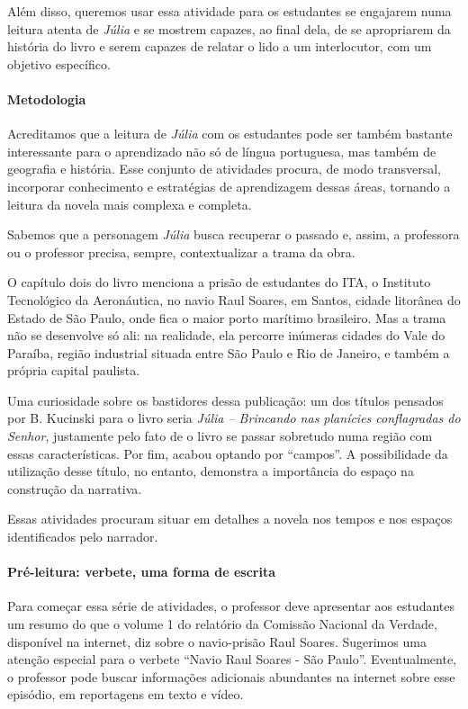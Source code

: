 \documentclass[12pt]{extarticle}
\begin{document}

Além disso, queremos usar essa atividade para os estudantes se engajarem
numa leitura atenta de \emph{Júlia} e se mostrem capazes, ao final dela,
de se apropriarem da história do livro e serem capazes de relatar o lido
a um interlocutor, com um objetivo específico.

\paragraph{Metodologia}

Acreditamos que a leitura de \emph{Júlia} com os estudantes pode ser
também bastante interessante para o aprendizado não só de língua
portuguesa, mas também de geografia e história. Esse conjunto de
atividades procura, de modo transversal, incorporar conhecimento e
estratégias de aprendizagem dessas áreas, tornando a leitura da novela
mais complexa e completa.

Sabemos que a personagem \emph{Júlia} busca recuperar o passado e,
assim, a professora ou o professor precisa, sempre, contextualizar a
trama da obra.

O capítulo dois do livro menciona a prisão de estudantes do ITA, o
Instituto Tecnológico da Aeronáutica, no navio Raul Soares, em Santos,
cidade litorânea do Estado de São Paulo, onde fica o maior porto
marítimo brasileiro. Mas a trama não se desenvolve só ali: na realidade,
ela percorre inúmeras cidades do Vale do Paraíba, região industrial
situada entre São Paulo e Rio de Janeiro, e também a própria capital
paulista.


Uma curiosidade sobre os bastidores dessa publicação: um dos títulos
pensados por B. Kucinski para o livro seria \emph{Júlia -- Brincando nas
planícies conflagradas do Senhor}, justamente pelo fato de o livro se
passar sobretudo numa região com essas características. Por fim, acabou
optando por ``campos''. A possibilidade da utilização desse título, no
entanto, demonstra a importância do espaço na construção da narrativa.

Essas atividades procuram situar em detalhes a novela nos tempos e nos
espaços identificados pelo narrador.

\paragraph{Pré-leitura: verbete, uma forma de escrita}

Para começar essa série de atividades, o professor deve apresentar aos
estudantes um resumo do que o volume 1 do relatório da Comissão Nacional
da Verdade, disponível na internet, diz sobre o navio-prisão Raul
Soares. Sugerimos uma atenção especial para o verbete ``Navio Raul
Soares - São Paulo''. Eventualmente, o professor pode buscar informações
adicionais abundantes na internet sobre esse episódio, em reportagens em
texto e vídeo.
\end{document}
